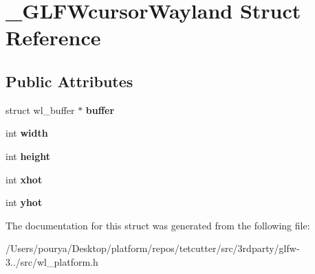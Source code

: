\hypertarget{struct__GLFWcursorWayland}{}\section{\+\_\+\+G\+L\+F\+Wcursor\+Wayland Struct Reference}
\label{struct__GLFWcursorWayland}
\subsection*{Public Attributes}
\begin{DoxyCompactItemize}
\item 
\hypertarget{struct__GLFWcursorWayland_a0001276ff2d1c51c8059cfe4ad48aed0}{}struct wl\+\_\+buffer $\ast$ {\bfseries buffer}\label{struct__GLFWcursorWayland_a0001276ff2d1c51c8059cfe4ad48aed0}

\item 
\hypertarget{struct__GLFWcursorWayland_ab8d34850bc04dad0d900a4fdf1b503dc}{}int {\bfseries width}\label{struct__GLFWcursorWayland_ab8d34850bc04dad0d900a4fdf1b503dc}

\item 
\hypertarget{struct__GLFWcursorWayland_a82da430425752b10026d8d9a119efb99}{}int {\bfseries height}\label{struct__GLFWcursorWayland_a82da430425752b10026d8d9a119efb99}

\item 
\hypertarget{struct__GLFWcursorWayland_a21136cecf3cbb7ecdba1ab5bf29d9050}{}int {\bfseries xhot}\label{struct__GLFWcursorWayland_a21136cecf3cbb7ecdba1ab5bf29d9050}

\item 
\hypertarget{struct__GLFWcursorWayland_a4aa9d790b2e10cb97120ede960f7f9ef}{}int {\bfseries yhot}\label{struct__GLFWcursorWayland_a4aa9d790b2e10cb97120ede960f7f9ef}

\end{DoxyCompactItemize}


The documentation for this struct was generated from the following file\+:\begin{DoxyCompactItemize}
\item 
/\+Users/pourya/\+Desktop/platform/repos/tetcutter/src/3rdparty/glfw-\/3../src/wl\+\_\+platform.\+h\end{DoxyCompactItemize}

